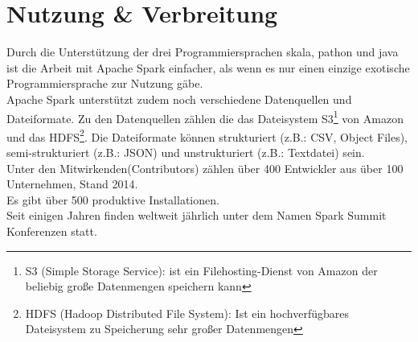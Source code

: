 \section{Nutzung \& Verbreitung}

Durch die Unterstützung der drei Programmiersprachen skala, pathon und java ist die Arbeit mit Apache Spark einfacher, als wenn es nur einen einzige exotische Programmiersprache zur Nutzung gäbe. \\

\noindent
Apache Spark unterstützt zudem noch verschiedene Datenquellen und Dateiformate.  Zu den Datenquellen zählen die das Dateisystem S3\footnote{S3 (Simple Storage Service): ist ein Filehosting-Dienst von Amazon der beliebig große Datenmengen speichern kann} von Amazon und das HDFS\footnote{HDFS (Hadoop Distributed File System): Ist ein hochverfügbares Dateisystem zu Speicherung sehr großer Datenmengen}.
Die Dateiformate können strukturiert (z.B.: CSV, Object Files), semi-strukturiert (z.B.: JSON) und unstrukturiert (z.B.: Textdatei) sein.\\

\noindent
Unter den Mitwirkenden(Contributors) zählen über 400 Entwickler aus über 100 Unternehmen, Stand 2014.\\
Es gibt über 500 produktive Installationen. \cite{ADD+15} \\ %

\noindent
Seit einigen Jahren finden weltweit jährlich unter dem Namen Spark Summit Konferenzen statt. \cite{SPCOM}\\



